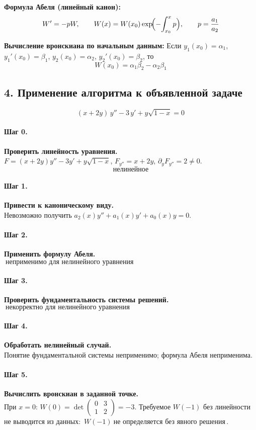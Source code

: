\textbf{Формула Абеля (линейный канон):}
\[
W'=-pW,\qquad W(x)=W(x_0)\exp\!\Bigl(-\!\int_{x_0}^{x}p\Bigr),\qquad p=\frac{a_1}{a_2}
\]

\textbf{Вычисление вронскиана по начальным данным:}
Если \(y_1(x_0)=\alpha_1\), \(y_1'(x_0)=\beta_1\), \(y_2(x_0)=\alpha_2\), \(y_2'(x_0)=\beta_2\), то
\[
W(x_0)=\alpha_1\beta_2-\alpha_2\beta_1
\]

\subsection*{4. Применение алгоритма к объявленной задаче}

\[
(x+2y)\,y''-3\,y'+y\sqrt{1-x}=0
\]

\paragraph{Шаг 0.} \textbf{Проверить линейность уравнения.}\\
\(F=(x+2y)y''-3y'+y\sqrt{1-x}\), \(F_{y''}=x+2y\), \(\partial_yF_{y''}=2\ne0\).
\[
\boxed{\ \text{нелинейное}\ }
\]

\paragraph{Шаг 1.} \textbf{Привести к каноническому виду.}\\
Невозможно получить \(a_2(x)y''+a_1(x)y'+a_0(x)y=0\).

\paragraph{Шаг 2.} \textbf{Применить формулу Абеля.}\\
\(\boxed{\ \text{неприменимо для нелинейного уравнения}\ }\)

\paragraph{Шаг 3.} \textbf{Проверить фундаментальность системы решений.}\\
\(\boxed{\ \text{некорректно для нелинейного уравнения}\ }\)

\paragraph{Шаг 4.} \textbf{Обработать нелинейный случай.}\\
Понятие фундаментальной системы неприменимо; формула Абеля неприменима.

\paragraph{Шаг 5.} \textbf{Вычислить вронскиан в заданной точке.}\\
При \(x=0\): \(W(0)=\det\begin{pmatrix}0&3\\1&2\end{pmatrix}=-3\). 
Требуемое \(W(-1)\) без линейности не выводится из данных: \(\boxed{\,W(-1)\ \text{не определяется без явного решения}\,}\).

